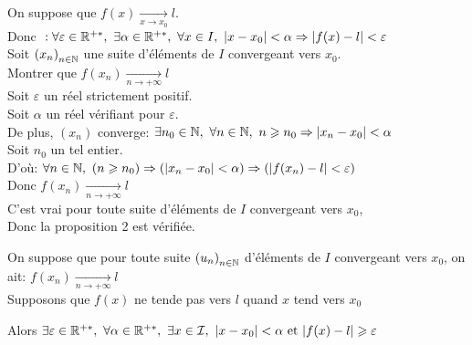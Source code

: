 \documentclass[12pt,twoside,a4paper]{article}
\begin{document}
		\begin{preuve}
			\begin{liste}
				\item On suppose que $f(x)\mathop{\longrightarrow}\limits_{x\rightarrow x_0} l$.\\
					Donc $\ :\forall \varepsilon \in\R^{+*},\ \exists\alpha\in\R^{+*},\ \forall x\in I,\ |x-x_0|<\alpha\Rightarrow |f(x)-l|<\varepsilon$\\
					Soit $\left( x_n\right) _{n\in\mathbb{N}}$ une suite d'\'el\'ements de $I$ convergeant vers $x_0$.\\
					Montrer que $f\left( x_n\right) \mathop{\longrightarrow}\limits_{n\rightarrow +\infty}l$\\
					Soit $\varepsilon$ un r\'eel strictement positif.\\
					Soit $\alpha$ un r\'eel v\'erifiant  pour $\varepsilon$.\\
					De plus, $\left( x_n\right) $ converge: $\exists n_0\in\N,\ \forall n\in\N,\ n\geqslant n_0\Rightarrow \left| x_n-x_0\right| <\alpha$\\
					Soit $n_0$ un tel entier.\\
					D'o\`u: $\forall n\in\mathbb{N},\ (n\geqslant n_0)\Rightarrow (\left| x_n-x_0\right| <\alpha) \Rightarrow (|f(x_n)-l|<\varepsilon)$\\
					Donc $f\left( x_n\right) \mathop{\longrightarrow}\limits_{n\rightarrow +\infty}l$\\
					C'est vrai pour toute suite d'\'el\'ements de $I$ convergeant vers $x_0$,\\
					Donc la proposition 2 est v\'erifi\'ee.
				\item On suppose que pour toute suite $\left(u_n \right)_{n\in\mathbb{N}}$ d'\'el\'ements de $I$ convergeant vers $x_0$, on ait: $f\left( x_n\right) \mathop{\longrightarrow}\limits_{n\rightarrow +\infty}l$\\
				 Supposons que $f(x)$ ne tende pas vers $l$ quand $x$ tend vers $x_0$
				\begin{tab}
					Alors $\exists \varepsilon\in\R^{+*},\ \forall \alpha\in\R^{+*},\ \exists x\in\I,\ |x-x_0|<\alpha\et|f(x)-l|\geqslant\varepsilon$
				\end{tab}
			\end{liste}
		\end{preuve}
\end{document}
